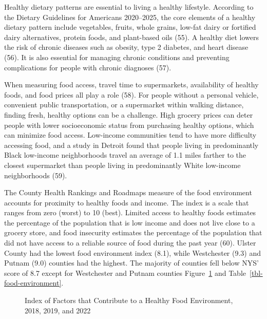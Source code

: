 \documentclass[
  english,
  letterpaper,
]{report}
\begin{document}
Healthy dietary patterns are essential to living a healthy lifestyle.
According to the Dietary Guidelines for Americans 2020--2025, the core
elements of a healthy dietary pattern include vegetables, fruits, whole
grains, low-fat dairy or fortified dairy alternatives, protein foods,
and plant-based oils (55). A healthy diet lowers the risk of chronic
diseases such as obesity, type 2 diabetes, and heart disease (56). It is
also essential for managing chronic conditions and preventing
complications for people with chronic diagnoses (57).

When measuring food access, travel time to supermarkets, availability of
healthy foods, and food prices all play a role (58). For people without
a personal vehicle, convenient public transportation, or a supermarket
within walking distance, finding fresh, healthy options can be a
challenge. High grocery prices can deter people with lower socioeconomic
status from purchasing healthy options, which can minimize food access.
Low-income communities tend to have more difficulty accessing food, and
a study in Detroit found that people living in predominantly Black
low-income neighborhoods travel an average of 1.1 miles farther to the
closest supermarket than people living in predominantly White low-income
neighborhoods (59).

The County Health Rankings and Roadmaps measure of the food environment
accounts for proximity to healthy foods and income. The index is a scale
that ranges from zero (worst) to 10 (best). Limited access to healthy
foods estimates the percentage of the population that is low income and
does not live close to a grocery store, and food insecurity estimates
the percentage of the population that did not have access to a reliable
source of food during the past year (60). Ulster County had the lowest
food environment index (8.1), while Westchester (9.3) and Putnam (9.0)
counties had the highest. The majority of counties fell below NYS' score
of 8.7 except for Westchester and Putnam counties
Figure~\ref{fig-food-environment} and Table~\ref{tbl-food-environment}.

\begin{figure}


\caption{\label{fig-food-environment}Index of Factors that Contribute to
a Healthy Food Environment, 2018, 2019, and 2022}

\end{figure}%
\end{document}
